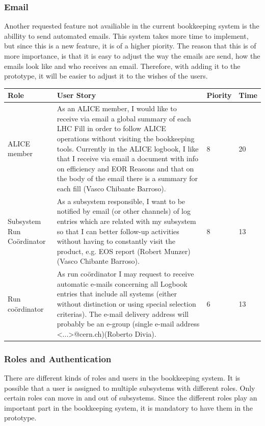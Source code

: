 \documentclass[paper=a4, fontsize=11pt,twoside]{scrartcl}	%
\begin{document}
\subsubsection{Email}
Another requested feature not availiable in the current bookkeeping system is the abillity to send automated emails. This system takes more time to implement, but since this is a new feature, it is of a higher piority. The reason that this is of more importance, is that it is easy to adjust the way the emails are send, how the emails look like and who receives an email. Therefore, with adding it to the prototype, it will be easier to adjust it to the wishes of the users.
\begin{longtable}{ | p{2cm} | p{8cm} | p{1.5cm} | l |}
\hline
Role & User Story & Piority & Time \\ \hline
ALICE member & As an ALICE member, I would like to receive via email a global summary of each LHC Fill in order to follow ALICE operations without visiting the bookkeeping tools. Currently in the ALICE logbook, I like that I receive via email a document with info on efficiency and EOR Reasons and that on the body of the email there is a summary for
each fill (Vasco Chibante Barroso). & 8 & 20 \\ \hline
Subsystem Run Coördinator &  As a subsystem responsible, I want to be notified by email (or other
channels) of log entries which are related with my subsystem so that I can better follow-up activities without having to constantly visit the product, e.g. EOS report (Robert Munzer) (Vasco Chibante Barroso). & 8 & 13 \\ \hline
Run coördinator & As run coördinator I may request to receive automatic e-mails concerning all Logbook entries that include all systems (either without distinction or using special selection criterias). The e-mail delivery address will probably be an e-group (single e-mail address <...>@cern.ch)(Roberto Divia). & 6 & 13 \\ \hline
\end{longtable}

\subsubsection{Roles and Authentication}
There are different kinds of roles and users in the bookkeeping system. It is possible that a user is assigned to multiple subsystems with different roles. Only certain roles can move in and out of subsystems. Since the different roles play an important part in the bookkeeping system, it is mandatory to have them in the prototype.
\end{document}
